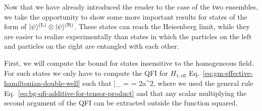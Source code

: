 
Now that we have already introduced the reader to the case of the two ensembles, we take the opportunity to show some more important results for states of the form of $\vert{\psi}\rangle^{(\text{L})} \otimes \vert{\psi}\rangle^{(\text{R})}$.
These states can reach the Heisenberg limit, while they are easier to realize experimentally than states in which the particles on the left and particles on the right are entangled with each other.

First, we will compute the bound for states insensitive to the homogeneous field.
For such states we only have to compute the QFI for $H_{1,\text{eff}}$ Eq.~\eqref{eq:gm-effective-hamiltonian-double-well} such that
\be
  |_{\max} = = 2a^2,
  \label{eq:gm-bound-insensitive-twoens-simplified}
\ee
where we used the general rule Eq.~\eqref{eq:bg-qfi-additive-for-tensor-product} and that any scalar multiplying the second argument of the QFI can be extracted outside the function squared.

